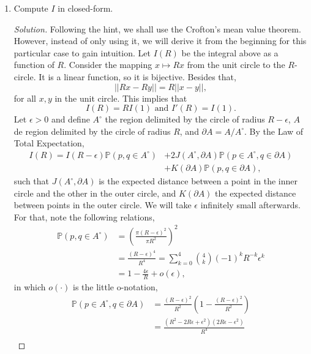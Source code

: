 \documentclass[a4paper,10pt, notitlepage]{report}
\newcommand{\pr}{\mathbb{P}}
\begin{document}
\begin{enumerate}
 \item Compute $I$ in closed-form.
 
 \begin{proof}[Solution]
    Following the hint, we shall use the Crofton's mean value theorem.
    However, instead of only using it, we will derive it from the beginning
    for this particular case to gain intuition. Let $I(R)$ be the integral
    above as a function of $R$. Consider the mapping $x \mapsto Rx$ from the
    unit circle to the $R$-circle. It is a linear function, so it is
    bijective. Besides that, 
    $$
    ||Rx - Ry|| = R||x-y||, 
    $$
    for all $x,y$ in the unit circle. This implies that 
    $$I(R) = RI(1) \text{ and } I'(R) = I(1).$$ 
    Let $\epsilon > 0$ and define $A^{\circ}$ the region delimited by the circle
    of radius $R - \epsilon$, $A$ de region delimited by the circle of radius
    $R$, and $\partial A = A / A^{\circ}$. By the Law of Total Expectation, 
    \begin{equation}
        \label{eq:law-total-expectation}
        \begin{split}
            I(R) = I(R - \epsilon)\pr(p,q \in A^{\circ}) &+ 2J(A^{\circ}, \partial A)\pr(p \in A^{\circ}, q \in \partial A) \\ 
            &+ K(\partial A)\pr(p, q \in \partial A),
        \end{split}
    \end{equation}
    such that $J(A^{\circ}, \partial A)$ is the expected distance between a
    point in the inner circle and the other in the outer circle, and
    $K(\partial A)$ the expected distance between points in the outer circle.
    We will take $\epsilon$ infinitely small afterwards. For that, note the
    following relations, 
    \begin{align*}
        \pr(p,q \in A^{\circ}) &= \left(\frac{\pi(R-\epsilon)^2}{\pi R^2}\right)^2 \\
        &= \frac{(R-\epsilon)^4}{R^4} = \sum_{k=0}^4 \binom{4}{k} (-1)^k R^{-k}\epsilon^{k} \\ 
        &= 1 - \frac{4\epsilon}{R} + o(\epsilon),  
    \end{align*}
    in which $o(\cdot)$ is the little o-notation, 
    \begin{align*}
        \pr(p \in A^{\circ}, q \in \partial A) &= \frac{(R-\epsilon)^2}{R^2}\left(1 - \frac{(R-\epsilon)^2}{R^2}\right) \\
        &= \frac{(R^2 -2R\epsilon + \epsilon^2)(2R\epsilon - \epsilon^2)}{R^4} \\ 

\end{align*}
\end{proof}
\end{enumerate}
\end{document}
